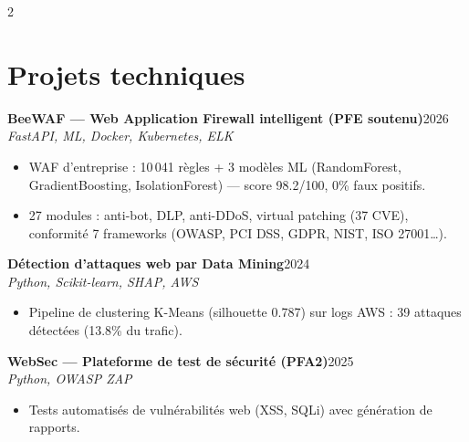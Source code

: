 \documentclass[a4paper,10pt]{article}
\newcommand{\role}[3]{%
  {\bfseries #1}\hfill{\small\color{graytext}#2}\\[1pt]
  {\itshape\small\color{accentlight}#3}\par\vspace{2pt}}
\begin{document}
\begin{paracol}{2}
\section{Projets techniques}
\role{BeeWAF — Web Application Firewall intelligent (PFE soutenu)}{2026}{FastAPI, ML, Docker, Kubernetes, ELK}
\begin{itemize}
  \item WAF d'entreprise : 10\,041 règles + 3 modèles ML (RandomForest, GradientBoosting, IsolationForest) — score 98.2/100, 0\% faux positifs.
  \item 27 modules : anti-bot, DLP, anti-DDoS, virtual patching (37 CVE), conformité 7 frameworks (OWASP, PCI DSS, GDPR, NIST, ISO 27001\dots).
\end{itemize}
\role{Détection d'attaques web par Data Mining}{2024}{Python, Scikit-learn, SHAP, AWS}
\begin{itemize}
  \item Pipeline de clustering K-Means (silhouette 0.787) sur logs AWS : 39 attaques détectées (13.8\% du trafic).
\end{itemize}
\role{WebSec — Plateforme de test de sécurité (PFA2)}{2025}{Python, OWASP ZAP}
\begin{itemize}
  \item Tests automatisés de vulnérabilités web (XSS, SQLi) avec génération de rapports.
\end{itemize}

\end{paracol}
\end{document}
